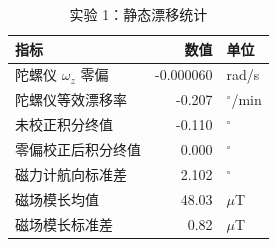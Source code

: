 \begin{table}[H]
\centering
\begin{tabular}{lrl}
\toprule
指标 & 数值 & 单位 \\
\midrule
陀螺仪 $\omega_z$ 零偏 & -0.000060 & rad/s \\
陀螺仪等效漂移率 & -0.207 & $^\circ$/min \\
未校正积分终值 & -0.110 & $^\circ$ \\
零偏校正后积分终值 & 0.000 & $^\circ$ \\
磁力计航向标准差 & 2.102 & $^\circ$ \\
磁场模长均值 & 48.03 & $\mu$T \\
磁场模长标准差 & 0.82 & $\mu$T \\
\bottomrule
\end{tabular}
\caption{实验 1：静态漂移统计}
\label{tab:exp1}
\end{table}
